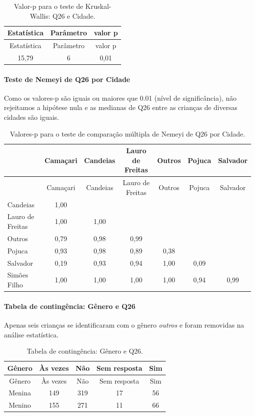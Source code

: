 \documentclass[]{article}
\let\oldparagraph\paragraph
\renewcommand{\paragraph}[1]{\oldparagraph{#1}\mbox{}}
\begin{document}
\begin{longtable}[]{@{}ccc@{}}
\caption{\label{tab:unnamed-chunk-728}Valor-p para o teste de Kruskal-Wallis: Q26 e Cidade.}\tabularnewline
\toprule
Estatística & Parâmetro & valor p\tabularnewline
\midrule
\endfirsthead
\toprule
Estatística & Parâmetro & valor p\tabularnewline
\midrule
\endhead
15,79 & 6 & 0,01\tabularnewline
\bottomrule
\end{longtable}

\hypertarget{teste-de-nemeyi-de-q26-por-cidade}{%
\paragraph{Teste de Nemeyi de Q26 por Cidade}\label{teste-de-nemeyi-de-q26-por-cidade}}

Como os valores-p são iguais ou maiores que 0.01 (nível de significância), não rejeitamos a hipótese nula e as medianas de Q26 entre as crianças de diversas cidades são iguais.

\begin{longtable}[]{@{}lcccccc@{}}
\caption{\label{tab:unnamed-chunk-730}Valores-p para o teste de comparação múltipla de Nemeyi de Q26 por Cidade.}\tabularnewline
\toprule
& Camaçari & Candeias & Lauro de Freitas & Outros & Pojuca & Salvador\tabularnewline
\midrule
\endfirsthead
\toprule
& Camaçari & Candeias & Lauro de Freitas & Outros & Pojuca & Salvador\tabularnewline
\midrule
\endhead
Candeias & 1,00 & & & & &\tabularnewline
Lauro de Freitas & 1,00 & 1,00 & & & &\tabularnewline
Outros & 0,79 & 0,98 & 0,99 & & &\tabularnewline
Pojuca & 0,93 & 0,98 & 0,89 & 0,38 & &\tabularnewline
Salvador & 0,19 & 0,93 & 0,94 & 1,00 & 0,09 &\tabularnewline
Simões Filho & 1,00 & 1,00 & 1,00 & 1,00 & 0,94 & 0,99\tabularnewline
\bottomrule
\end{longtable}

\cleardoublepage

\hypertarget{tabela-de-continguxeancia-guxeanero-e-q26}{%
\paragraph{Tabela de contingência: Gênero e Q26}\label{tabela-de-continguxeancia-guxeanero-e-q26}}

Apenas seis crianças se identificaram com o gênero \emph{outros} e foram removidas na análise estatística.

\begin{longtable}[]{@{}ccccc@{}}
\caption{\label{tab:unnamed-chunk-731}Tabela de contingência: Gênero e Q26.}\tabularnewline
\toprule
Gênero & Às vezes & Não & Sem resposta & Sim\tabularnewline
\midrule
\endfirsthead
\toprule
Gênero & Às vezes & Não & Sem resposta & Sim\tabularnewline
\midrule
\endhead
Menina & 149 & 319 & 17 & 56\tabularnewline
Menino & 155 & 271 & 11 & 66\tabularnewline
\bottomrule
\end{longtable}
\end{document}
